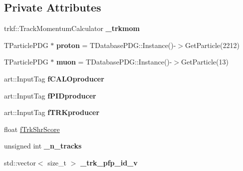 \subsection*{Private Attributes}
\begin{DoxyCompactItemize}
\item 
\hypertarget{classanalysis_1_1TrackAnalysis_aa69136b70c77e0f034fe009b86ba591b}{trkf\-::\-Track\-Momentum\-Calculator {\bfseries \-\_\-trkmom}}\label{classanalysis_1_1TrackAnalysis_aa69136b70c77e0f034fe009b86ba591b}

\item 
\hypertarget{classanalysis_1_1TrackAnalysis_a4adc7f89c334ab93747a8d4c4abbcc6d}{T\-Particle\-P\-D\-G $\ast$ {\bfseries proton} = T\-Database\-P\-D\-G\-::\-Instance()-\/$>$Get\-Particle(2212)}\label{classanalysis_1_1TrackAnalysis_a4adc7f89c334ab93747a8d4c4abbcc6d}

\item 
\hypertarget{classanalysis_1_1TrackAnalysis_a0fe3b9e7864aaaa36b5f52826b4e3eb9}{T\-Particle\-P\-D\-G $\ast$ {\bfseries muon} = T\-Database\-P\-D\-G\-::\-Instance()-\/$>$Get\-Particle(13)}\label{classanalysis_1_1TrackAnalysis_a0fe3b9e7864aaaa36b5f52826b4e3eb9}

\item 
\hypertarget{classanalysis_1_1TrackAnalysis_a0ceaf940b041eda0237cc73cd330d18d}{art\-::\-Input\-Tag {\bfseries f\-C\-A\-L\-Oproducer}}\label{classanalysis_1_1TrackAnalysis_a0ceaf940b041eda0237cc73cd330d18d}

\item 
\hypertarget{classanalysis_1_1TrackAnalysis_a349dc117e508190c619cd9f47ea7647e}{art\-::\-Input\-Tag {\bfseries f\-P\-I\-Dproducer}}\label{classanalysis_1_1TrackAnalysis_a349dc117e508190c619cd9f47ea7647e}

\item 
\hypertarget{classanalysis_1_1TrackAnalysis_a45abdcf3140e68a2ce90501e33a00eb3}{art\-::\-Input\-Tag {\bfseries f\-T\-R\-Kproducer}}\label{classanalysis_1_1TrackAnalysis_a45abdcf3140e68a2ce90501e33a00eb3}

\item 
float \hyperlink{classanalysis_1_1TrackAnalysis_a49502213574f13be542aaab647940ffd}{f\-Trk\-Shr\-Score}
\item 
\hypertarget{classanalysis_1_1TrackAnalysis_a965f2969aac19332af4597a364586c5d}{unsigned int {\bfseries \-\_\-n\-\_\-tracks}}\label{classanalysis_1_1TrackAnalysis_a965f2969aac19332af4597a364586c5d}

\item 
\hypertarget{classanalysis_1_1TrackAnalysis_a204ef1a35c4346e36ffba8ced3c6ce5c}{std\-::vector$<$ size\-\_\-t $>$ {\bfseries \-\_\-trk\-\_\-pfp\-\_\-id\-\_\-v}}\label{classanalysis_1_1TrackAnalysis_a204ef1a35c4346e36ffba8ced3c6ce5c}


\end{DoxyCompactItemize}
